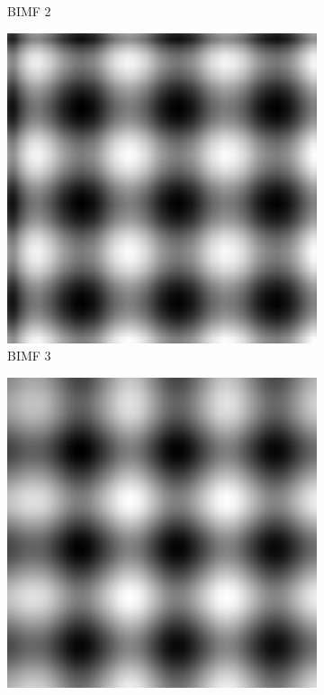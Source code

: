 \begin{figure}
\begin{subfigure}{.30\textwidth}
  \caption{BIMF 2}
\end{subfigure}
\begin{subfigure}{.30\textwidth}
  \centering
  \includegraphics[width=.9\linewidth]{img/s_1_1_3}
  \caption{BIMF 3}
\end{subfigure}
\begin{subfigure}{.30\textwidth}
  \centering
  \includegraphics[width=.9\linewidth]{img/s_1_1_4}

\end{subfigure}
\end{figure}
